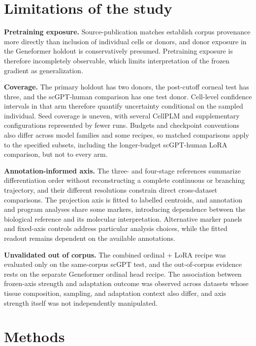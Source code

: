 \documentclass[12pt,letterpaper]{article}
\begin{document}
\section*{Limitations of the study}

\textbf{Pretraining exposure.} Source-publication matches establish corpus provenance more directly than inclusion of individual cells or donors, and donor exposure in the Geneformer holdout is conservatively presumed. Pretraining exposure is therefore incompletely observable, which limits interpretation of the frozen gradient as generalization.

\textbf{Coverage.} The primary holdout has two donors, the post-cutoff corneal test has three, and the scGPT-human comparison has one test donor. Cell-level confidence intervals in that arm therefore quantify uncertainty conditional on the sampled individual. Seed coverage is uneven, with several CellPLM and supplementary configurations represented by fewer runs. Budgets and checkpoint conventions also differ across model families and some recipes, so matched comparisons apply to the specified subsets, including the longer-budget scGPT-human LoRA comparison, but not to every arm.

\textbf{Annotation-informed axis.} The three- and four-stage references summarize differentiation order without reconstructing a complete continuous or branching trajectory, and their different resolutions constrain direct cross-dataset comparisons. The projection axis is fitted to labelled centroids, and annotation and program analyses share some markers, introducing dependence between the biological reference and its molecular interpretation. Alternative marker panels and fixed-axis controls address particular analysis choices, while the fitted readout remains dependent on the available annotations.

\textbf{Unvalidated out of corpus.} The combined ordinal + LoRA recipe was evaluated only on the same-corpus scGPT test, and the out-of-corpus evidence rests on the separate Geneformer ordinal head recipe. The association between frozen-axis strength and adaptation outcome was observed across datasets whose tissue composition, sampling, and adaptation context also differ, and axis strength itself was not independently manipulated.

\section*{Methods}
\end{document}
